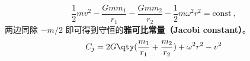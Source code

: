 
\begin{issues}
\issueDraft
\end{issues}


\begin{equation}\label{JacCon_eq1}
\frac{1}{2}mv^2 - \frac{Gmm_1}{r_1} - \frac{Gmm_2}{r_2} - \frac{1}{2}m\omega^2 r^2 = \text{const}~,
\end{equation}
两边同除 $-m/2$ 即可得到守恒的\textbf{雅可比常量（Jacobi constant）}。
\begin{equation}
C_j = 2G\qty(\frac{m_1}{r_1} + \frac{m_2}{r_2}) + \omega^2 r^2 - v^2
\end{equation}
